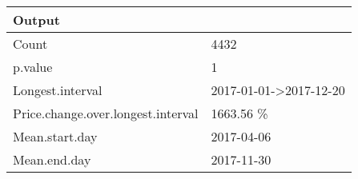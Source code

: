 \begin{table}[!tbp]
\begin{center}
\begin{tabular}{ll}
\hline\hline
\multicolumn{1}{l}{Output}&\multicolumn{1}{c}{}\tabularnewline
\hline
Count&4432\tabularnewline
p.value&1\tabularnewline
Longest.interval&2017-01-01-\textgreater 2017-12-20\tabularnewline
Price.change.over.longest.interval&1663.56 \%\tabularnewline
Mean.start.day&2017-04-06\tabularnewline
Mean.end.day&2017-11-30\tabularnewline
\hline
\end{tabular}\end{center}
\end{table}
